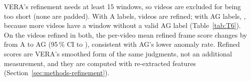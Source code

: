 VERA's refinement needs at least 15 windows, so  videos are excluded for being too short (none are padded). With A labels,  videos are refined; with AG labels, , because  more videos have a window without a valid AG label (Table~\ref{tab:T6}). On the  videos refined in both, the per-video mean refined frame score changes by  from A to AG (95\,\% CI  to ), consistent with AG's lower anomaly rate. Refined scores are VERA's smoothed form of the same judgments, not an additional measurement, and they are computed with re-extracted features (Section~\ref{sec:methods-refinement}).
